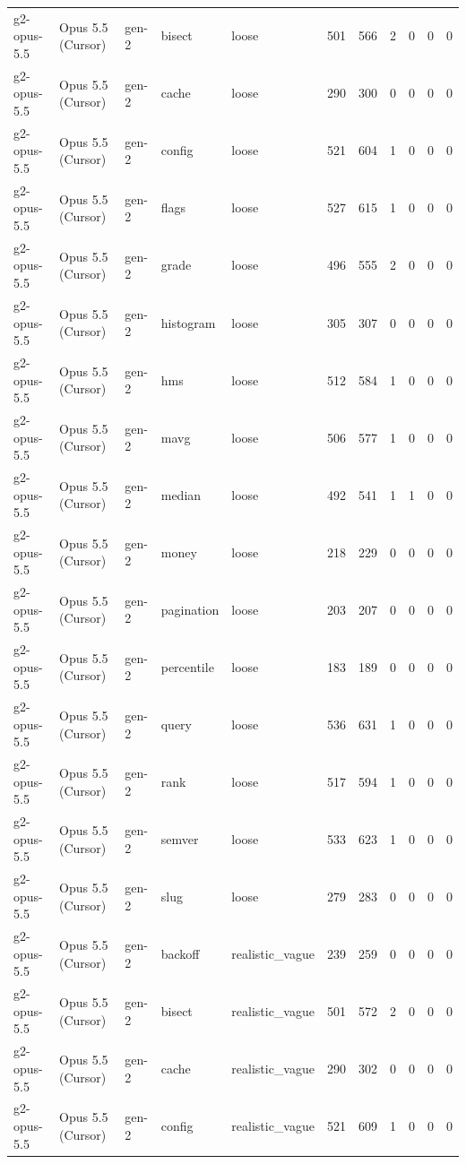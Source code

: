 \begin{tabular}{lllllllllll}
g2-opus-5.5 & Opus 5.5 (Cursor) & gen-2 & bisect & loose & 501 & 566 & 2 & 0 & 0 & 0 \\
g2-opus-5.5 & Opus 5.5 (Cursor) & gen-2 & cache & loose & 290 & 300 & 0 & 0 & 0 & 0 \\
g2-opus-5.5 & Opus 5.5 (Cursor) & gen-2 & config & loose & 521 & 604 & 1 & 0 & 0 & 0 \\
g2-opus-5.5 & Opus 5.5 (Cursor) & gen-2 & flags & loose & 527 & 615 & 1 & 0 & 0 & 0 \\
g2-opus-5.5 & Opus 5.5 (Cursor) & gen-2 & grade & loose & 496 & 555 & 2 & 0 & 0 & 0 \\
g2-opus-5.5 & Opus 5.5 (Cursor) & gen-2 & histogram & loose & 305 & 307 & 0 & 0 & 0 & 0 \\
g2-opus-5.5 & Opus 5.5 (Cursor) & gen-2 & hms & loose & 512 & 584 & 1 & 0 & 0 & 0 \\
g2-opus-5.5 & Opus 5.5 (Cursor) & gen-2 & mavg & loose & 506 & 577 & 1 & 0 & 0 & 0 \\
g2-opus-5.5 & Opus 5.5 (Cursor) & gen-2 & median & loose & 492 & 541 & 1 & 1 & 0 & 0 \\
g2-opus-5.5 & Opus 5.5 (Cursor) & gen-2 & money & loose & 218 & 229 & 0 & 0 & 0 & 0 \\
g2-opus-5.5 & Opus 5.5 (Cursor) & gen-2 & pagination & loose & 203 & 207 & 0 & 0 & 0 & 0 \\
g2-opus-5.5 & Opus 5.5 (Cursor) & gen-2 & percentile & loose & 183 & 189 & 0 & 0 & 0 & 0 \\
g2-opus-5.5 & Opus 5.5 (Cursor) & gen-2 & query & loose & 536 & 631 & 1 & 0 & 0 & 0 \\
g2-opus-5.5 & Opus 5.5 (Cursor) & gen-2 & rank & loose & 517 & 594 & 1 & 0 & 0 & 0 \\
g2-opus-5.5 & Opus 5.5 (Cursor) & gen-2 & semver & loose & 533 & 623 & 1 & 0 & 0 & 0 \\
g2-opus-5.5 & Opus 5.5 (Cursor) & gen-2 & slug & loose & 279 & 283 & 0 & 0 & 0 & 0 \\
g2-opus-5.5 & Opus 5.5 (Cursor) & gen-2 & backoff & realistic\_vague & 239 & 259 & 0 & 0 & 0 & 0 \\
g2-opus-5.5 & Opus 5.5 (Cursor) & gen-2 & bisect & realistic\_vague & 501 & 572 & 2 & 0 & 0 & 0 \\
g2-opus-5.5 & Opus 5.5 (Cursor) & gen-2 & cache & realistic\_vague & 290 & 302 & 0 & 0 & 0 & 0 \\
g2-opus-5.5 & Opus 5.5 (Cursor) & gen-2 & config & realistic\_vague & 521 & 609 & 1 & 0 & 0 & 0 \\

\end{tabular}
